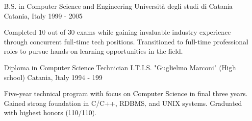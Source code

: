 \pagebreak



\begin{cventries}

  \cventry
  {B.S. in Computer Science and Engineering} %
  {Università degli studi di Catania} %
  {Catania, Italy} %
  {1999 - 2005} %
  {
    \begin{cvitems} %
      Completed 10 out of 30 exams while gaining invaluable industry experience through concurrent full-time tech positions.
      Transitioned to full-time professional roles to pursue hands-on learning opportunities in the field.   \end{cvitems}
  }

  \cventry
  {Diploma in Computer Science Technician}
  {I.T.I.S. "Guglielmo Marconi" (High school)} %
  {Catania, Italy} %
  {1994 - 199} %
  {
    \begin{cvitems} %
      Five-year technical program with focus on Computer Science in final three years.
      Gained strong foundation in C/C++, RDBMS, and UNIX systems.
      Graduated with highest honors (110/110).
    \end{cvitems}
  }

\end{cventries}
